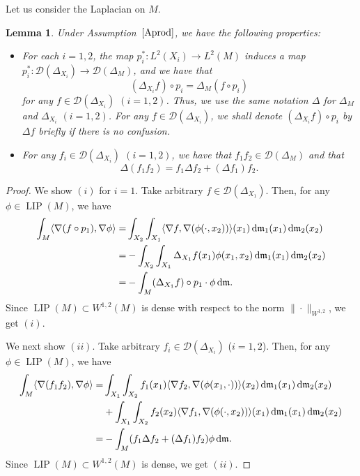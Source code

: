 \documentclass[10pt,a4paper]{amsart}
\numberwithin{equation}{section}
\newtheorem{Lem}[Thm]{Lemma}
\theoremstyle{definition}
\newcommand{\LIP}{\operatorname{LIP}}
\newcommand{\mf}{\mathfrak{m}}
\newcommand{\D}{\mathcal{D}}
\begin{document}
Let us consider the Laplacian on $M$.
\begin{Lem}\label{Laprod}
Under Assumption~$\ref{Aprod}$, we have the following properties:
\begin{itemize}\itemsep=0pt
\item[$(i)$] For each $i=1,2$, the map $p_i^\ast\colon L^2(X_i)\to L^2(M)$ induces a map $p_i^\ast \colon \D(\Delta_{X_i})\to \D(\Delta_M)$, and we have that
\[
(\Delta_{X_i}f)\circ p_i=\Delta_M(f\circ p_i)
\]
for any $f\in \D(\Delta_{X_i})$ $(i=1,2)$.
Thus, we use the same notation $\Delta$ for $\Delta_M$ and $\Delta_{X_i}$ $(i=1,2)$.
For any $f\in \D(\Delta_{X_i})$, we shall denote $(\Delta_{X_i} f)\circ p_i$ by $\Delta f$ briefly if there is no confusion.
\item[$(ii)$] For any $f_i\in\D(\Delta_{X_i})$ $(i=1,2)$, we have that $f_1 f_2\in\D(\Delta_M)$ and that
\[
\Delta(f_1 f_2)=f_1\Delta f_2+(\Delta f_1) f_2.
\]
\end{itemize}
\end{Lem}
\begin{proof}
We show $(i)$ for $i=1$.
Take arbitrary $f\in \D(\Delta_{X_1})$.
Then, for any $\phi\in \LIP(M)$, we have
\begin{align*}
\int_M\langle\nabla (f\circ p_1),\nabla\phi\rangle
=&\int_{X_2}\int_{X_1}\langle\nabla f,\nabla (\phi(\cdot,x_2))\rangle(x_1)\,{\rm d}\mf_1(x_1)\,{\rm d}\mf_2(x_2)\\
=&-\int_{X_2}\int_{X_1} \Delta_{X_1} f(x_1)\phi(x_1,x_2)\,{\rm d}\mf_1(x_1)\,{\rm d}\mf_2(x_2)\\
=&-\int_M (\Delta_{X_1} f)\circ p_1 \cdot \phi \,{\rm d}\mf .
\end{align*}
Since $\LIP(M)\subset W^{1,2}(M)$ is dense with respect to the norm $\|\cdot\|_{W^{1,2}}$, we get $(i)$.

We next show $(ii)$.
Take arbitrary $f_i\in\D(\Delta_{X_i})$ ($i=1,2$).
Then, for any $\phi\in\LIP(M)$, we have
\begin{align*}
\int_M\langle\nabla (f_1 f_2),\nabla\phi\rangle=&\int_{X_1}\int_{X_2}f_1(x_1)\langle\nabla f_2,\nabla (\phi(x_1,\cdot))\rangle(x_2)\,{\rm d}\mf_1(x_1)\,{\rm d}\mf_2(x_2)
\\
&{}+ \int_{X_1}\int_{X_2}f_2(x_2)\langle\nabla f_1,\nabla (\phi(\cdot, x_2))\rangle(x_1)\,{\rm d}\mf_1(x_1)\,{\rm d}\mf_2(x_2)
\\
=&-\int_M (f_1\Delta f_2+(\Delta f_1)f_2) \phi \,{\rm d}\mf.
\end{align*}
Since $\LIP(M)\subset W^{1,2}(M)$ is dense, we get $(ii)$.
\end{proof}
\end{document}
